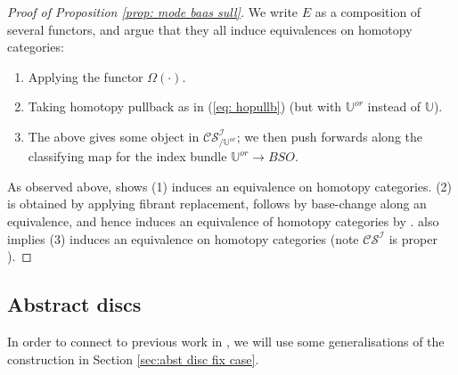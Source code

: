 \documentclass{TPmod}
\def\bU{\mathbb{U}}
\newcommand{\cC}{\mathcal{C}}
\newcommand{\cI}{\mathcal{I}}
\newcommand{\cS}{\mathcal{S}}
\numberwithin{equation}{section}
\begin{document}
    \begin{proof}[Proof of Proposition \ref{prop: mode baas sull}]
        We write $E$ as a composition of several functors, and argue that they all induce equivalences on homotopy categories:
        \begin{enumerate}
            \item Applying the functor $\Omega(\cdot)$.
            
            \item Taking homotopy pullback as in (\ref{eq: hopullb}) (but with $\bU^{or}$ instead of $\bU$).


            \item The above gives some object in $\cC\cS^\cI_{/\bU^{or}}$; we then push forwards along the classifying map for the index bundle $\bU^{or} \to BSO$.
        \end{enumerate}

        As observed above, \cite{Sagave-Schlichtkrull:Gp} shows (1) induces an equivalence on homotopy categories. (2) is obtained by applying fibrant replacement, follows by base-change along an equivalence, and hence induces an equivalence of homotopy categories by \cite[Proposition 2.7]{Rezk}. \cite[Proposition 2.7]{Rezk} also implies (3) induces an equivalence on homotopy categories (note $\cC\cS^\cI$ is proper \cite[Proposition 3.5]{Sagave-Schlichtkrull:Diagram}).
    \end{proof}

    
\subsection{Abstract discs}\label{sec:abstract discs and the Thom I-space}
    In order to connect to previous work in \cite{PS2}, we will use some generalisations of the construction in Section \ref{sec:abst disc fix case}.
\end{document}
